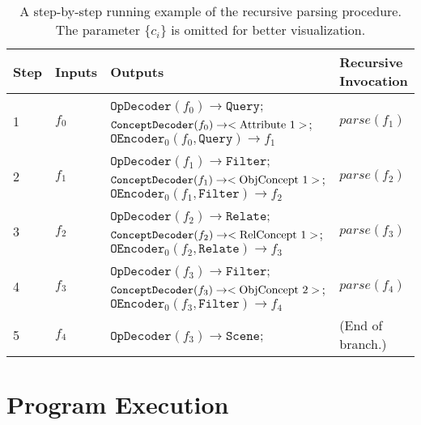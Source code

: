 \documentclass{article} \usepackage{iclr2019_conference,times}
\begin{document}
\begin{table}[th]
    \centering
    \begin{tabular}{llp{}l}
    \toprule
        Step & Inputs & Outputs & Recursive Invocation \\ \midrule
        1 & $f_0$ &
        $\texttt{OpDecoder}(f_0) \rightarrow \texttt{Query}$;\newline
        $\texttt{ConceptDecoder}(f_0) \rightarrow <\textnormal{Attribute 1}>$;\newline
        $\texttt{OEncoder}_0(f_0, \texttt{Query}) \rightarrow f_1$
        &$parse(f_1)$\\ \midrule
        2 & $f_1$ &
        $\texttt{OpDecoder}(f_1) \rightarrow \texttt{Filter}$;\newline
        $\texttt{ConceptDecoder}(f_1) \rightarrow <\textnormal{ObjConcept 1}>$;\newline
        $\texttt{OEncoder}_0(f_1, \texttt{Filter}) \rightarrow f_2$
        &$parse(f_2)$\\ \midrule
        3 & $f_2$ &
        $\texttt{OpDecoder}(f_2) \rightarrow \texttt{Relate}$;\newline
        $\texttt{ConceptDecoder}(f_2) \rightarrow <\textnormal{RelConcept 1}>$;\newline
        $\texttt{OEncoder}_0(f_2, \texttt{Relate}) \rightarrow f_3$
        &$parse(f_3)$\\ \midrule
        4 & $f_3$ &
        $\texttt{OpDecoder}(f_3) \rightarrow \texttt{Filter}$;\newline
        $\texttt{ConceptDecoder}(f_3) \rightarrow <\textnormal{ObjConcept 2}>$;\newline
        $\texttt{OEncoder}_0(f_3, \texttt{Filter}) \rightarrow f_4$
        &$parse(f_4)$\\ \midrule
        5 & $f_4$ &
        $\texttt{OpDecoder}(f_3) \rightarrow \texttt{Scene}$;
        & (End of branch.)\\ \bottomrule
    \end{tabular}
    \caption{A step-by-step running example of the recursive parsing procedure. The parameter $\{c_i\}$ is omitted for better visualization.}
    \label{tab:parse-example}
\end{table}

\section{Program Execution}
\label{sec:app:execution}
\end{document}
